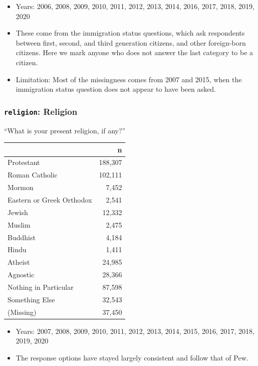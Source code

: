 \documentclass[10pt,article,oneside]{memoir}
\theoremstyle{definition}
\begin{document}
\begin{itemize}
\tightlist
\item
  Years: 2006, 2008, 2009, 2010, 2011, 2012, 2013, 2014, 2016, 2017,
  2018, 2019, 2020
\item
  These come from the immigration status questions, which ask
  respondents between first, second, and third generation citizens, and
  other foreign-born citizens. Here we mark anyone who does not answer
  the last category to be a citizen.
\item
  Limitation: Most of the missingness comes from 2007 and 2015, when the
  immigration status question does not appear to have been asked.
\end{itemize}

\hypertarget{religion-religion}{%
\subsubsection{\texorpdfstring{\texttt{religion}:
Religion}{religion: Religion}}\label{religion-religion}}

``What is your present religion, if any?''

\begin{table}[H]
\centering
\begin{tabular}{lr}
\toprule
 & n\\
\midrule
Protestant & 188,307\\
Roman Catholic & 102,111\\
Mormon & 7,452\\
Eastern or Greek Orthodox & 2,541\\
Jewish & 12,332\\
Muslim & 2,475\\
Buddhist & 4,184\\
Hindu & 1,411\\
Atheist & 24,985\\
Agnostic & 28,366\\
Nothing in Particular & 87,598\\
Something Else & 32,543\\
(Missing) & 37,450\\
\bottomrule
\end{tabular}
\end{table}

\begin{itemize}
\tightlist
\item
  Years: 2007, 2008, 2009, 2010, 2011, 2012, 2013, 2014, 2015, 2016,
  2017, 2018, 2019, 2020
\item
  The response options have stayed largely consistent and follow that of
  Pew.
\end{itemize}
\end{document}
